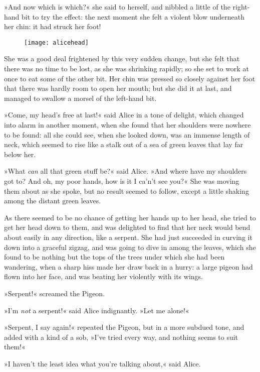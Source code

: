 »And now which is which?« she said to herself, and nibbled a little of the right-hand bit to try the effect: the next moment she felt a violent blow underneath her chin: it had struck her foot!

\begin{figure}[tbh]
\centering
\texttt{[image: alicehead]}
\end{figure}

She was a good deal frightened by this very sudden change, but she felt that there was no time to be lost, as she was shrinking rapidly; so she set to work at once to eat some of the other bit. Her chin was pressed so closely against her foot that there was hardly room to open her mouth; but she did it at last, and managed to swallow a morsel of the left-hand bit.

\divider

»Come, my head's free at last!« said Alice in a tone of delight, which changed into alarm in another moment, when she found that her shoulders were nowhere to be found: all she could see, when she looked down, was an immense length of neck, which seemed to rise like a stalk out of a sea of green leaves that lay far below her.

»What \textit{can} all that green stuff be?« said Alice. »And where have my shoulders got to? And oh, my poor hands, how is it I ca'n't see you?« She was moving them about as she spoke, but no result seemed to follow, except a little shaking among the distant green leaves.

As there seemed to be no chance of getting her hands up to her head, she tried to get her head down to them, and was delighted to find that her neck would bend about easily in any direction, like a serpent. She had just succeeded in curving it down into a graceful zigzag, and was going to dive in among the leaves, which she found to be nothing but the tops of the trees under which she had been wandering, when a sharp hiss made her draw back in a hurry: a large pigeon had flown into her face, and was beating her violently with its wings.

»Serpent!« screamed the Pigeon.

»I'm \textit{not} a serpent!« said Alice indignantly. »Let me alone!«

»Serpent, I say again!« repeated the Pigeon, but in a more subdued tone, and added with a kind of a sob, »I've tried every way, and nothing seems to suit them!«

»I haven't the least idea what you're talking about,« said Alice.

